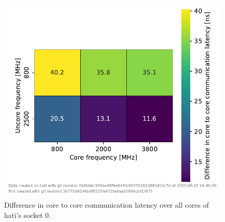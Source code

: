 \begin{figure}[]
    \centering
    \includegraphics[width=0.8\columnwidth]{fig/core-to-core-latency/all-to-all-heatmap-diff.pdf}
    \caption{\label{fig:cbo-latencies-socket-diff}Difference in core to core communication latency over all cores of hati's socket 0.}
\end{figure}